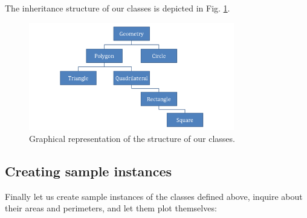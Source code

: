 \documentclass[article,A4,12pt]{llncs}
\begin{document}
The inheritance structure of our classes is depicted in Fig. \ref{fig:classes}.

\begin{figure}[!ht]
\begin{center}
\includegraphics[width=0.8\textwidth]{img/classes.png}
\end{center}
\vspace{-2mm}
\caption{Graphical representation of the structure of our classes.}
\label{fig:classes}
\end{figure}

\subsection{Creating sample instances}

Finally let us create sample instances of the classes defined above, inquire
about their areas and perimeters, and let them plot themselves:
\end{document}
